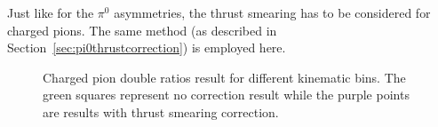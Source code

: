 Just like for the $\pi^0$ asymmetries, the thrust smearing has to be considered for charged pions. The same method (as described in Section~\ref{sec:pi0thrustcorrection}) is employed here. 
\iffalse
\begin{figure}[H]
  \centering     
  \caption{Charged pion double ratios result for different kinematic bins. The green squares represent no correction result while the purple points are results with thrust smearing correction.}
\label{fig:chargedpion}
\end{figure}
